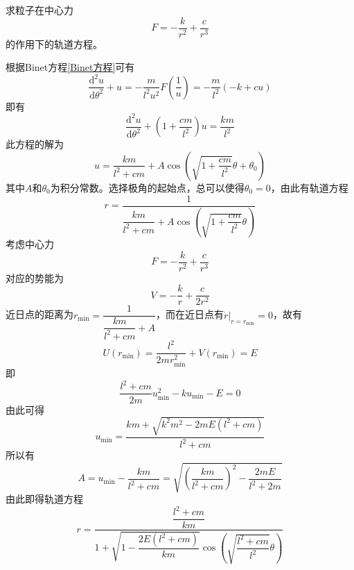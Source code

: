 \begin{question}[98页3.6]
\label{理论力学：题3.6}
求粒子在中心力
\begin{equation*}
	F = -\frac{k}{r^2}+\frac{c}{r^3}
\end{equation*}
的作用下的轨道方程。
\end{question}
\begin{solution}
根据Binet方程\eqref{Binet方程}可有
\begin{equation*}
	\frac{\mathrm{d}^2 u}{\mathrm{d} \theta^2} + u = -\frac{m}{l^2 u^2} F\left(\frac{1}{u}\right) = -\frac{m}{l^2}(-k+cu)
\end{equation*}
即有
\begin{equation*}
	\frac{\mathrm{d}^2 u}{\mathrm{d} \theta^2} + \left(1+\frac{cm}{l^2}\right) u = \frac{km}{l^2}
\end{equation*}
此方程的解为
\begin{equation*}
	u = \frac{km}{l^2+cm} + A\cos \left(\sqrt{1+\frac{cm}{l^2}} \theta + \theta_0\right)
\end{equation*}
其中$A$和$\theta_0$为积分常数。选择极角的起始点，总可以使得$\theta_0=0$，由此有轨道方程
\begin{equation*}
	r = \frac{1}{\dfrac{km}{l^2+cm} + A\cos \left(\sqrt{1+\dfrac{cm}{l^2}} \theta\right)}
\end{equation*}
考虑中心力
\begin{equation*}
	F = -\frac{k}{r^2}+\frac{c}{r^3}
\end{equation*}
对应的势能为
\begin{equation*}
	V = -\frac{k}{r} + \frac{c}{2r^2}
\end{equation*}
近日点的距离为$r_{\min} = \dfrac{1}{\dfrac{km}{l^2+cm} + A}$，而在近日点有$\dot{r}\big|_{r=r_{\min}} = 0$，故有
\begin{equation*}
	U(r_{\min}) = \frac{l^2}{2m r_{\min}^2} + V(r_{\min}) = E
\end{equation*}
即
\begin{equation*}
	\frac{l^2+cm}{2m} u_{\min}^2 - ku_{\min} - E = 0
\end{equation*}
由此可得
\begin{equation*}
	u_{\min} = \frac{km+\sqrt{k^2m^2-2mE(l^2+cm)}}{l^2+cm}
\end{equation*}
所以有
\begin{equation*}
	A = u_{\min} - \frac{km}{l^2+cm} = \sqrt{\left(\frac{km}{l^2+cm}\right)^2 - \frac{2mE}{l^2+2m}}
\end{equation*}
由此即得轨道方程
\begin{equation*}
	r = \frac{\dfrac{l^2+cm}{km}}{1 + \sqrt{1-\dfrac{2E(l^2+cm)}{km}}\cos \left(\sqrt{\dfrac{l^2+cm}{l^2}} \theta\right)}
\end{equation*}
\end{solution}

